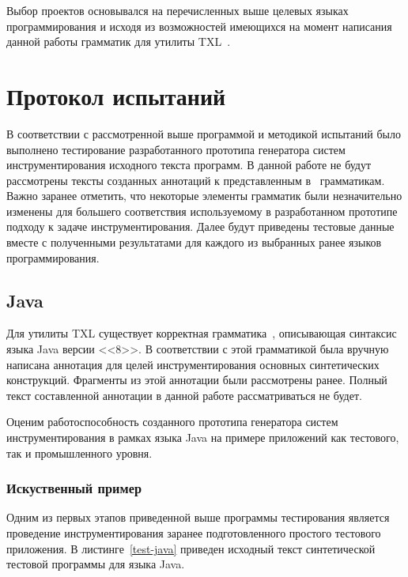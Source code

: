 Выбор проектов основывался на перечисленных выше целевых языках программирования и исходя из возможностей имеющихся на момент написания данной работы грамматик для утилиты TXL~\cite{txl-resources}.

\section{Протокол испытаний}

В соответствии с рассмотренной выше программой и методикой испытаний было выполнено тестирование разработанного прототипа генератора систем инструментирования исходного текста программ.
В данной работе не будут рассмотрены тексты созданных аннотаций к представленным в~\cite{txl-resources} грамматикам.
Важно заранее отметить, что некоторые элементы грамматик были незначительно изменены для большего соответствия используемому в разработанном прототипе подходу к задаче инструментирования.
Далее будут приведены тестовые данные вместе с полученными результатами для каждого из выбранных ранее языков программирования.

\subsection{Java}

Для утилиты TXL существует корректная грамматика~\cite{txl-resources}, описывающая синтаксис языка Java версии <<8>>.
В соответствии с этой грамматикой была вручную написана аннотация для целей инструментирования основных синтетических конструкций.
Фрагменты из этой аннотации были рассмотрены ранее.
Полный текст составленной аннотации в данной работе рассматриваться не будет.

Оценим работоспособность созданного прототипа генератора систем инструментирования в рамках языка Java на примере приложений как тестового, так и промышленного уровня.

\subsubsection{Искуственный пример}

Одним из первых этапов приведенной выше программы тестирования является проведение инструментирования заранее подготовленного простого тестового приложения.
В листинге~\ref{test-java} приведен исходный текст синтетической тестовой программы для языка Java.

